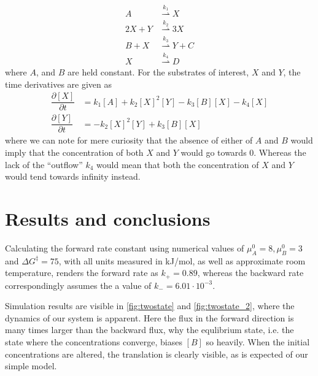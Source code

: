 \documentclass[a4paper,12pt]{article}
\newcommand{\partt}[2]{\ensuremath{\dfrac{\partial {#1}}{\partial {#2}}}}
\theoremstyle{plain}
\theoremstyle{definition}
\begin{document}
         \begin{align*}
            A        &\stackrel{k_1}{\rightharpoonup} X \\
            2X + Y   &\stackrel{k_2}{\rightharpoonup} 3X \\
            B + X    &\stackrel{k_3}{\rightharpoonup} Y + C \\
            X        &\stackrel{k_4}{\rightharpoonup} D
         \end{align*}
         where $A$, and $B$ are held constant. For the substrates of interest,
         $X$ and $Y$, the time derivatives are given as
         \begin{align*}
            \partt{[X]}{t} &= k_1[A] + k_2[X]^2[Y] - k_3[B][X] - k_4[X] \\
            \partt{[Y]}{t} &= -k_2[X]^2[Y] + k_3[B][X]
         \end{align*}
         where we can note for mere curiosity that the absence of either of $A$ 
         and $B$ would imply that the concentration of both $X$ and $Y$ would go 
         towards 0. Whereas the lack of the ``outflow'' $k_4$ would mean that
         both the concentration of $X$ and $Y$ would tend towards infinity
         instead.~\cite{lecnotes}

\section{Results and conclusions}

      Calculating the forward rate constant using numerical values of 
      $\mu_A^0 = 8, \mu_B^0 = 3$ and $\Delta G^{\ddagger} = 75$, with all units
      measured in kJ/mol, as well as approximate room temperature, renders the forward
      rate as $k_+ = 0.89$, whereas the backward rate correspondingly assumes
      the a value of $k_- = 6.01 \cdot 10^{-3}$. 

      Simulation results are visible in \cref{fig:twostate} and
      \cref{fig:twostate_2}, where the dynamics of our system is apparent. Here
      the flux in the forward direction is many times larger than the backward
      flux, why the equlibrium state, i.e. the state where the concentrations
      converge, biases $[B]$ so heavily. When the initial concentrations are
      altered, the translation is clearly visible, as is expected of our simple
      model. 
\end{document}
